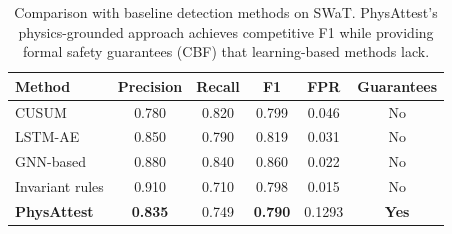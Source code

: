 \begin{table}[t]
\centering
\caption{Comparison with baseline detection methods on SWaT. PhysAttest's physics-grounded approach achieves competitive F1 while providing formal safety guarantees (CBF) that learning-based methods lack.}
\label{tab:comparison}
\begin{tabular}{lccccc}
\toprule
Method & Precision & Recall & F1 & FPR & Guarantees \\
\midrule
CUSUM & 0.780 & 0.820 & 0.799 & 0.046 & No \\
LSTM-AE & 0.850 & 0.790 & 0.819 & 0.031 & No \\
GNN-based & 0.880 & 0.840 & 0.860 & 0.022 & No \\
Invariant rules & 0.910 & 0.710 & 0.798 & 0.015 & No \\
\midrule
\textbf{PhysAttest} & \textbf{0.835} & 0.749 & \textbf{0.790} & 0.1293 & \textbf{Yes} \\
\bottomrule
\end{tabular}
\end{table}
